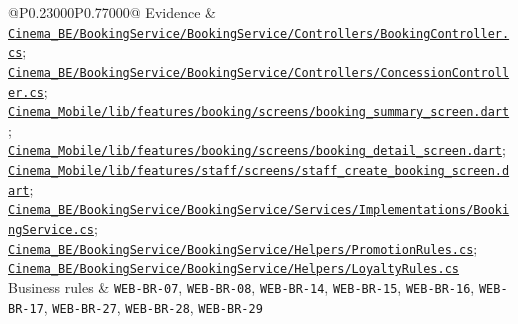 \begin{longtable}{@{}P{0.23000\SRSWidth}P{0.77000\SRSWidth}@{}}
Evidence & \href{../../../Cinema\_BE/BookingService/BookingService/Controllers/BookingController.cs}{\texttt{Cinema\_\allowbreak{}BE/\allowbreak{}Booking\allowbreak{}Service/\allowbreak{}Booking\allowbreak{}Service/\allowbreak{}Controll\allowbreak{}ers/\allowbreak{}Booking\allowbreak{}Controll\allowbreak{}er.\allowbreak{}cs}}; \href{../../../Cinema\_BE/BookingService/BookingService/Controllers/ConcessionController.cs}{\texttt{Cinema\_\allowbreak{}BE/\allowbreak{}Booking\allowbreak{}Service/\allowbreak{}Booking\allowbreak{}Service/\allowbreak{}Controll\allowbreak{}ers/\allowbreak{}Concessi\allowbreak{}on\allowbreak{}Controll\allowbreak{}er.\allowbreak{}cs}}; \href{../../../Cinema\_Mobile/lib/features/booking/screens/booking\_summary\_screen.dart}{\texttt{Cinema\_\allowbreak{}Mobile/\allowbreak{}lib/\allowbreak{}features\allowbreak{}/\allowbreak{}booking/\allowbreak{}screens/\allowbreak{}booking\_\allowbreak{}summary\_\allowbreak{}screen.\allowbreak{}dart}}; \href{../../../Cinema\_Mobile/lib/features/booking/screens/booking\_detail\_screen.dart}{\texttt{Cinema\_\allowbreak{}Mobile/\allowbreak{}lib/\allowbreak{}features\allowbreak{}/\allowbreak{}booking/\allowbreak{}screens/\allowbreak{}booking\_\allowbreak{}detail\_\allowbreak{}screen.\allowbreak{}dart}}; \href{../../../Cinema\_Mobile/lib/features/staff/screens/staff\_create\_booking\_screen.dart}{\texttt{Cinema\_\allowbreak{}Mobile/\allowbreak{}lib/\allowbreak{}features\allowbreak{}/\allowbreak{}staff/\allowbreak{}screens/\allowbreak{}staff\_\allowbreak{}create\_\allowbreak{}booking\_\allowbreak{}screen.\allowbreak{}dart}}; \href{../../../Cinema\_BE/BookingService/BookingService/Services/Implementations/BookingService.cs}{\texttt{Cinema\_\allowbreak{}BE/\allowbreak{}Booking\allowbreak{}Service/\allowbreak{}Booking\allowbreak{}Service/\allowbreak{}Services\allowbreak{}/\allowbreak{}Implemen\allowbreak{}tations/\allowbreak{}Booking\allowbreak{}Service.\allowbreak{}cs}}; \href{../../../Cinema\_BE/BookingService/BookingService/Helpers/PromotionRules.cs}{\texttt{Cinema\_\allowbreak{}BE/\allowbreak{}Booking\allowbreak{}Service/\allowbreak{}Booking\allowbreak{}Service/\allowbreak{}Helpers/\allowbreak{}Promotio\allowbreak{}n\allowbreak{}Rules.\allowbreak{}cs}}; \href{../../../Cinema\_BE/BookingService/BookingService/Helpers/LoyaltyRules.cs}{\texttt{Cinema\_\allowbreak{}BE/\allowbreak{}Booking\allowbreak{}Service/\allowbreak{}Booking\allowbreak{}Service/\allowbreak{}Helpers/\allowbreak{}Loyalty\allowbreak{}Rules.\allowbreak{}cs}} \\[3pt]
Business rules & \texttt{WEB-\allowbreak{}BR-\allowbreak{}07}, \texttt{WEB-\allowbreak{}BR-\allowbreak{}08}, \texttt{WEB-\allowbreak{}BR-\allowbreak{}14}, \texttt{WEB-\allowbreak{}BR-\allowbreak{}15}, \texttt{WEB-\allowbreak{}BR-\allowbreak{}16}, \texttt{WEB-\allowbreak{}BR-\allowbreak{}17}, \texttt{WEB-\allowbreak{}BR-\allowbreak{}27}, \texttt{WEB-\allowbreak{}BR-\allowbreak{}28}, \texttt{WEB-\allowbreak{}BR-\allowbreak{}29} \\[3pt]

\end{longtable}
